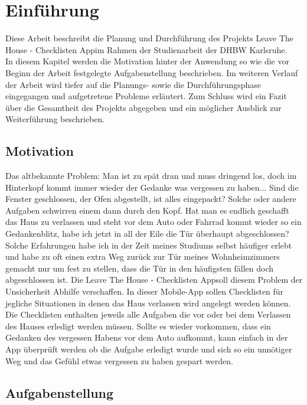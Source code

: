 \chapter{Einführung}\label{chpt:einführung}

Diese Arbeit beschreibt die Planung und Durchführung des Projekts \glqq Leave The House - Checklisten App\grqq im Rahmen der Studienarbeit der \ac{DHBW} Karlsruhe.\\
In diesem Kapitel werden die Motivation hinter der Anwendung so wie die vor Beginn der Arbeit festgelegte Aufgabenstellung beschrieben. Im weiteren Verlauf der Arbeit wird tiefer auf die Planungs- sowie die Durchführungsphase eingegangen und aufgetretene Probleme erläutert. Zum Schluss wird ein Fazit über die Gesamtheit des Projekts abgegeben und ein möglicher Ausblick zur Weiterführung beschrieben.

\section{Motivation}\label{sec:motivation}

Das altbekannte Problem: Man ist zu spät dran und muss dringend los, doch im Hinterkopf kommt immer wieder der Gedanke was vergessen zu haben... Sind die Fenster geschlossen, der Ofen abgestellt, ist alles eingepackt? Solche oder andere Aufgaben schwirren einem dann durch den Kopf. Hat man es endlich geschafft das Haus zu verlassen und steht vor dem Auto oder Fahrrad kommt wieder so ein Gedankenblitz, habe ich jetzt in all der Eile die Tür überhaupt abgeschlossen?\\
Solche Erfahrungen habe ich in der Zeit meines Studiums selbst häufiger erlebt und habe zu oft einen extra Weg zurück zur Tür meines Wohnheimzimmers gemacht nur um fest zu stellen, dass die Tür in den häufigsten fällen doch abgeschlossen ist. Die \glqq Leave The House - Checklisten App\grqq soll diesem Problem der Unsicherheit Abhilfe verschaffen. In dieser Mobile-App sollen Checklisten für jegliche Situationen in denen das Haus verlassen wird angelegt werden können. Die Checklisten enthalten jeweils alle Aufgaben die vor oder bei dem Verlassen des Hauses erledigt werden müssen. Sollte es wieder vorkommen, dass ein Gedanken des vergessen Habens vor dem Auto aufkommt, kann einfach in der App überprüft werden ob die Aufgabe erledigt wurde und sich so ein unnötiger Weg und das Gefühl etwas vergessen zu haben gespart werden.

\section{Aufgabenstellung}\label{sec:Aufgabenstellung}

